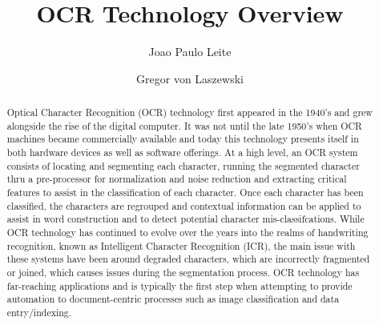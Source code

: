 

\title{OCR Technology Overview}


\author{Joao Paulo Leite}

\author{Gregor von Laszewski}


\renewcommand{\shortauthors}{J. Leite}


\begin{abstract}

Optical Character Recognition (OCR) technology first appeared in the 1940's and grew alongside the rise of the digital computer. It was not until the late 1950's when OCR machines became commercially available and today this technology presents itself in both hardware devices as well as software offerings. At a high level, an OCR system consists of locating and segmenting each character, running the segmented character thru a pre-processor for normalization and noise reduction and extracting critical features to assist in the classification of each character. Once each character has been classified, the characters are regrouped and contextual information can be applied to assist in word construction and to detect potential character mis-classifcations. While OCR technology has continued to evolve over the years into the realms of handwriting recognition, known as Intelligent Character Recognition (ICR), the main issue with these systems have been around degraded characters, which are incorrectly fragmented or joined, which causes issues during the segmentation process. OCR technology has far-reaching applications and is typically the first step when attempting to provide automation to document-centric processes such as image classification and data entry/indexing. 

\end{abstract}



\maketitle


